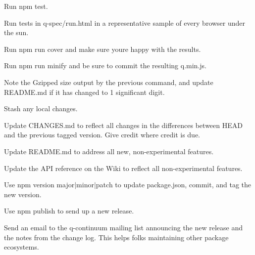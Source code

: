 \begin{DoxyItemize}
\item Run {\ttfamily npm test}.
\item Run tests in {\ttfamily q-\/spec/run.\+html} in a representative sample of every browser under the sun.
\item Run {\ttfamily npm run cover} and make sure you\textquotesingle{}re happy with the results.
\item Run {\ttfamily npm run minify} and be sure to commit the resulting {\ttfamily q.\+min.\+js}.
\item Note the Gzipped size output by the previous command, and update {\ttfamily README.\+md} if it has changed to 1 significant digit.
\item Stash any local changes.
\item Update {\ttfamily CHANGES.\+md} to reflect all changes in the differences between {\ttfamily HEAD} and the previous tagged version. Give credit where credit is due.
\item Update {\ttfamily README.\+md} to address all new, non-\/experimental features.
\item Update the API reference on the Wiki to reflect all non-\/experimental features.
\item Use {\ttfamily npm version major\texorpdfstring{$\vert$}{|}minor\texorpdfstring{$\vert$}{|}patch} to update {\ttfamily package.\+json}, commit, and tag the new version.
\item Use {\ttfamily npm publish} to send up a new release.
\item Send an email to the q-\/continuum mailing list announcing the new release and the notes from the change log. This helps folks maintaining other package ecosystems. 
\end{DoxyItemize}